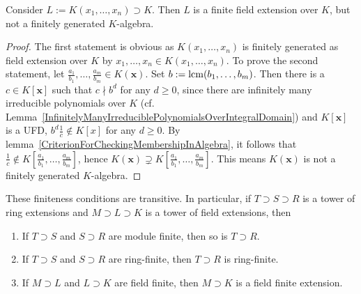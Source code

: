 \begin{proposition}\label{PolynomialQuotientFieldIsFieldFiniteNotRingFinite}
    Consider $L:= K(x_1,\dots,x_n) \supset K$. Then $L$ is a finite field extension over $K$, but not a finitely generated $K$-algebra.
\end{proposition}
\begin{proof}
    The first statement is obvious as $K(x_1,\dots,x_n)$ is finitely generated as field extension over $K$ by $x_1,\dots,x_n\in K(x_1,\dots,x_n)$. To prove the second statement, let $\frac{a_1}{b_1},\dots,\frac{a_m}{b_m}\in K(\mathbf{x})$. Set $b:=\mathrm{lcm}(b_1,\dots,b_m)$. Then there is a $c\in K[\mathbf{x}]$ such that $c\nmid b^d$ for any $d\geq 0$, since there are infinitely many irreducible polynomials over $K$ (cf. Lemma~\ref{InfinitelyManyIrreduciblePolynomialsOverIntegralDomain}) and $K[\mathbf{x}]$ is a UFD, $b^d \frac{1}{c}\notin K[x]$ for any $d\geq 0$. By lemma~\ref{CriterionForCheckingMembershipInAlgebra}, it follows that $\frac{1}{c}\notin K\left[\frac{a_1}{b_1},\dots,\frac{a_m}{b_m}\right]$, hence $K(\mathbf{x})\supsetneq K\left[\frac{a_1}{b_1},\dots,\frac{a_m}{b_m}\right]$. This means $K(\mathbf{x})$ is not a finitely generated $K$-algebra. 
\end{proof}
\begin{lemma}\label{TransitivityOfFinitenessConditions}
    These finiteness conditions are transitive. In particular, if $T\supset S \supset R$ is a tower of ring extensions and $M\supset L\supset K$ is a tower of field extensions, then
    \begin{enumerate}
        \item If $T\supset S$ and $S\supset R$ are module finite, then so is $T\supset R$.  
        \item If $T\supset S$ and $S\supset R$ are ring-finite, then $T\supset R$ is ring-finite.
        \item If $M\supset L$ and $L\supset K$ are field finite, then $M\supset K$ is a field finite extension. 
    \end{enumerate}
\end{lemma}
